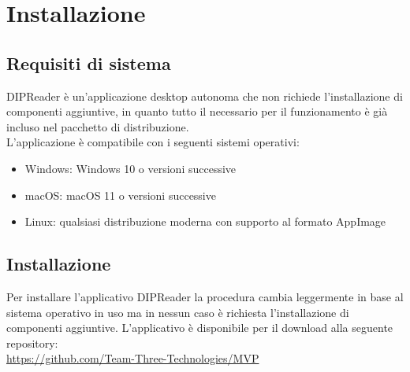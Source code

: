 \documentclass[a4paper,12pt]{article}
\begin{document}
    \section{Installazione}
        \subsection{Requisiti di sistema}
        DIPReader è un'applicazione desktop autonoma che non richiede l'installazione di componenti aggiuntive, in quanto tutto il necessario per il funzionamento è già incluso nel pacchetto di distribuzione.\\

        L'applicazione è compatibile con i seguenti sistemi operativi:
        \begin{itemize}
            \item Windows: Windows 10 o versioni successive
            \item macOS: macOS 11 o versioni successive
            \item Linux: qualsiasi distribuzione moderna con supporto al formato AppImage
        \end{itemize}

        \subsection{Installazione}
            Per installare l'applicativo DIPReader la procedura cambia leggermente in base al sistema operativo in uso ma in nessun caso è richiesta l'installazione di componenti aggiuntive.
            L'applicativo è disponibile per il download alla seguente repository: \\
            \url{https://github.com/Team-Three-Technologies/MVP}
\end{document}
